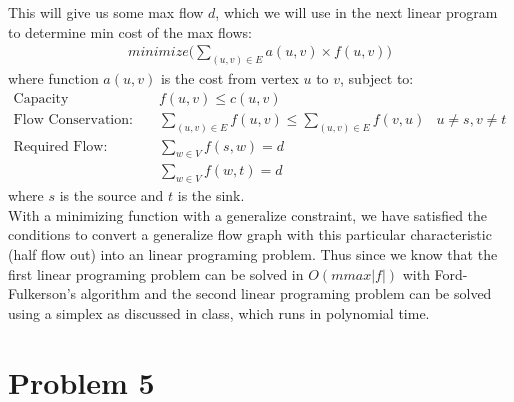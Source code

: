 \documentclass[11pt]{article}
\begin{document}
This will give us some max flow $d$, which we will use in the next linear program to determine min cost of the max flows:\\
\begin{align*}
minimize \bigg( \sum_{(u,v) \in E}^{} a(u,v)\times f(u,v) \bigg)
\end{align*}
where function $a(u,v)$ is the cost from vertex $u$ to $v$, subject to:\\
\begin{align*}
\text{Capacity Constraints: }&f(u,v) \leq c(u,v)\\
\text{Flow Conservation: }&\sum_{(u,v) \in E}^{} f(u,v) \leq \sum_{(u,v)\in E}^{} f(v,u) &
u\not= s, v\not=t\\
\text{Required Flow: }& \sum_{w \in V}^{} f(s,w) = d \\
&\sum_{w \in V}^{} f(w,t) = d
\end{align*}
where $s$ is the source and $t$ is the sink.\\
With a minimizing function with a generalize constraint, we have satisfied the conditions to convert a generalize flow graph with this particular characteristic (half flow out) into an linear programing problem. Thus since we know that the first linear programing problem can be solved in $O(m max |f|)$ with Ford-Fulkerson's algorithm and the second linear programing problem can be solved using a simplex as discussed in class, which runs in polynomial time.

\section*{Problem 5}
\end{document}
